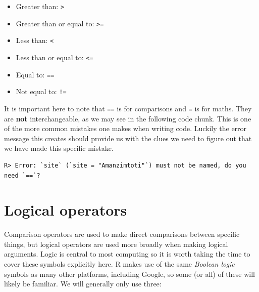 \documentclass[]{book}
\newenvironment{Shaded}{\begin{snugshade}}{\end{snugshade}}
\newcommand{\KeywordTok}[1]{\textcolor[rgb]{0.13,0.29,0.53}{\textbf{#1}}}
\newcommand{\DataTypeTok}[1]{\textcolor[rgb]{0.13,0.29,0.53}{#1}}
\newcommand{\StringTok}[1]{\textcolor[rgb]{0.31,0.60,0.02}{#1}}
\newcommand{\OperatorTok}[1]{\textcolor[rgb]{0.81,0.36,0.00}{\textbf{#1}}}
\newcommand{\NormalTok}[1]{#1}
\providecommand{\tightlist}{%
  \setlength{\itemsep}{0pt}\setlength{\parskip}{0pt}}
\theoremstyle{definition}
\theoremstyle{definition}
\theoremstyle{definition}
\theoremstyle{remark}
\begin{document}
\begin{itemize}
\tightlist
\item
  Greater than: \texttt{\textgreater{}}\\
\item
  Greater than or equal to: \texttt{\textgreater{}=}\\
\item
  Less than: \texttt{\textless{}}\\
\item
  Less than or equal to: \texttt{\textless{}=}\\
\item
  Equal to: \texttt{==}\\
\item
  Not equal to: \texttt{!=}
\end{itemize}

It is important here to note that \texttt{==} is for comparisons and
\texttt{=} is for maths. They are \textbf{not} interchangeable, as we
may see in the following code chunk. This is one of the more common
mistakes one makes when writing code. Luckily the error message this
creates should provide us with the clues we need to figure out that we
have made this specific mistake.

\begin{Shaded}
\end{Shaded}

\begin{verbatim}
R> Error: `site` (`site = "Amanzimtoti"`) must not be named, do you need `==`?
\end{verbatim}

\section{Logical operators}\label{logical-operators}

Comparison operators are used to make direct comparisons between
specific things, but logical operators are used more broadly when making
logical arguments. Logic is central to most computing so it is worth
taking the time to cover these symbols explicitly here. R makes use of
the same \emph{Boolean logic} symbols as many other platforms, including
Google, so some (or all) of these will likely be familiar. We will
generally only use three:
\end{document}
